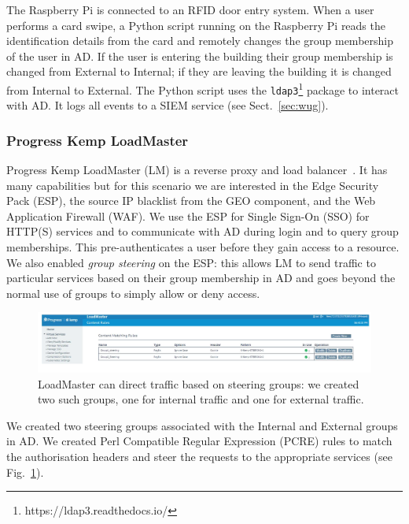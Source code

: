 The Raspberry Pi is connected to an RFID door entry system.  When a
user performs a card swipe, a Python script running on the Raspberry
Pi reads the identification details from the card and remotely changes
the group membership of the user in AD.  If the user is entering the
building their group membership is changed from External to Internal;
if they are leaving the building it is changed from Internal to
External.  The Python script uses the
\texttt{ldap3}\footnote{https://ldap3.readthedocs.io/} package to
interact with AD.  It logs all events to a SIEM service (see
Sect.~\ref{sec:wug}).

\subsubsection{Progress Kemp LoadMaster}

Progress Kemp LoadMaster (LM) is a reverse proxy and load
balancer~\cite{progress-kemp-loadmaster-xx}.  It has many capabilities
but for this scenario we are interested in the Edge Security Pack
(ESP), the source IP blacklist from the GEO component, and the Web
Application Firewall (WAF).  We use the ESP for Single Sign-On (SSO)
for HTTP(S) services and to communicate with AD during login and to
query group memberships.  This pre-authenticates a user before they
gain access to a resource.  We also enabled \textit{group steering} on
the ESP: this allows LM to send traffic to particular services based
on their group membership in AD and goes beyond the normal use of
groups to simply allow or deny access.

\begin{figure}
  \centerline{\includegraphics[width=\textwidth]{img/loadmaster-pcre-rules}}
  \caption{LoadMaster can direct traffic based on steering groups: we
    created two such groups, one for internal traffic and one for
    external traffic.}\label{fig:loadmaster-pcre-rules}
\end{figure}

We created two steering groups associated with the Internal and
External groups in AD.  We created Perl Compatible Regular Expression
(PCRE) rules to match the authorisation headers and steer the requests
to the appropriate services (see
Fig.~\ref{fig:loadmaster-pcre-rules}).

